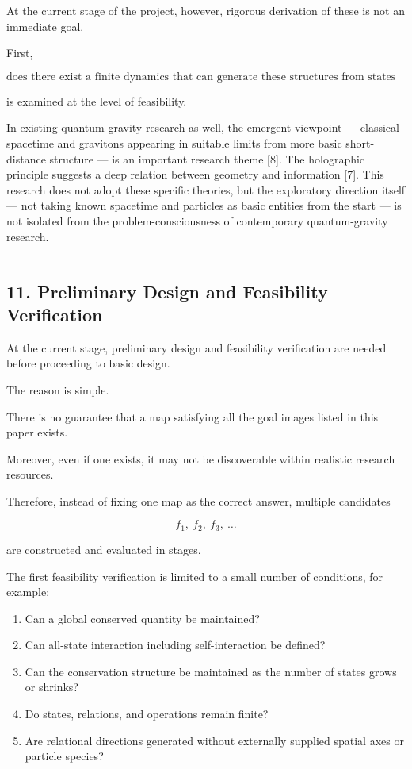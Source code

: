 \documentclass[
  a4paper,
]{article}
\providecommand{\tightlist}{%
  \setlength{\itemsep}{0pt}\setlength{\parskip}{0pt}}
\begin{document}
At the current stage of the project, however, rigorous derivation of
these is not an immediate goal.

First,

\[
\boxed{
\text{does there exist a finite dynamics that can generate these structures from states and relations alone?}
}
\]

is examined at the level of feasibility.

In existing quantum-gravity research as well, the emergent viewpoint ---
classical spacetime and gravitons appearing in suitable limits from more
basic short-distance structure --- is an important research theme
{[}8{]}. The holographic principle suggests a deep relation between
geometry and information {[}7{]}. This research does not adopt these
specific theories, but the exploratory direction itself --- not taking
known spacetime and particles as basic entities from the start --- is
not isolated from the problem-consciousness of contemporary
quantum-gravity research.

\begin{center}\rule{0.5\linewidth}{0.5pt}\end{center}

\subsection{11. Preliminary Design and Feasibility
Verification}\label{preliminary-design-and-feasibility-verification}

At the current stage, preliminary design and feasibility verification
are needed before proceeding to basic design.

The reason is simple.

There is no guarantee that a map satisfying all the goal images listed
in this paper exists.

Moreover, even if one exists, it may not be discoverable within
realistic research resources.

Therefore, instead of fixing one map as the correct answer, multiple
candidates

\[
f_1,
\ f_2,
\ f_3,
\ \ldots
\]

are constructed and evaluated in stages.

The first feasibility verification is limited to a small number of
conditions, for example:

\begin{enumerate}
\def\labelenumi{\arabic{enumi}.}
\tightlist
\item
  Can a global conserved quantity be maintained?
\item
  Can all-state interaction including self-interaction be defined?
\item
  Can the conservation structure be maintained as the number of states
  grows or shrinks?
\item
  Do states, relations, and operations remain finite?
\item
  Are relational directions generated without externally supplied
  spatial axes or particle species?
\end{enumerate}
\end{document}
